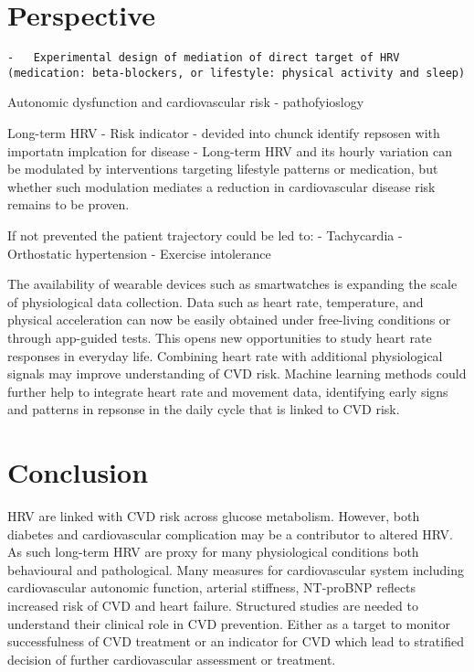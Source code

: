 \documentclass[
  a4paper,
  headsepline=true,
  open=any]{scrbook}
\begin{document}
\hypertarget{perspective}{%
\chapter{Perspective}\label{perspective}}

\begin{verbatim}
-   Experimental design of mediation of direct target of HRV (medication: beta-blockers, or lifestyle: physical activity and sleep)
\end{verbatim}

Autonomic dysfunction and cardiovascular risk - pathofyioslogy

Long-term HRV - Risk indicator - devided into chunck identify repsosen
with importatn implcation for disease - Long-term HRV and its hourly
variation can be modulated by interventions targeting lifestyle patterns
or medication, but whether such modulation mediates a reduction in
cardiovascular disease risk remains to be proven.

If not prevented the patient trajectory could be led to: - Tachycardia -
Orthostatic hypertension - Exercise intolerance

The availability of wearable devices such as smartwatches is expanding
the scale of physiological data collection. Data such as heart rate,
temperature, and physical acceleration can now be easily obtained under
free-living conditions or through app-guided tests. This opens new
opportunities to study heart rate responses in everyday life. Combining
heart rate with additional physiological signals may improve
understanding of CVD risk. Machine learning methods could further help
to integrate heart rate and movement data, identifying early signs and
patterns in repsonse in the daily cycle that is linked to CVD risk.


\hypertarget{conclusion}{%
\chapter{Conclusion}\label{conclusion}}

HRV are linked with CVD risk across glucose metabolism. However, both
diabetes and cardiovascular complication may be a contributor to altered
HRV. As such long-term HRV are proxy for many physiological conditions
both behavioural and pathological. Many measures for cardiovascular
system including cardiovascular autonomic function, arterial stiffness,
NT-proBNP reflects increased risk of CVD and heart failure. Structured
studies are needed to understand their clinical role in CVD prevention.
Either as a target to monitor successfulness of CVD treatment or an
indicator for CVD which lead to stratified decision of further
cardiovascular assessment or treatment.
\end{document}
